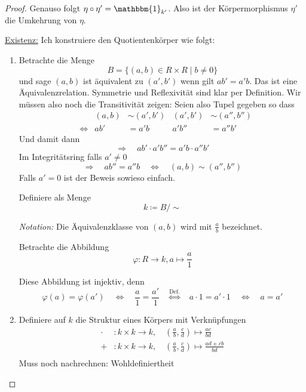 \documentclass[12pt,parskip=full]{scrartcl}
\newcommand{\heading}{\underline}
\theoremstyle{definition}
\theoremstyle{remark}
\begin{document}
\begin{proof}
		Genauso folgt $\eta \circ \eta'= \mathbbm{1}_{k'}$. Also ist der Körpermorphismus $\eta'$ die Umkehrung von $\eta$.
		
		\heading{Existenz:} Ich konstruiere den Quotientenkörper wie folgt:
		\begin{enumerate}
			\item Betrachte die Menge
			\begin{equation*}
				B = \{ (a,b) \in R \times R \mid b \neq 0 \}
			\end{equation*}
			und sage $(a,b)$ ist äquivalent zu $(a', b')$ wenn gilt $a b' = a' b$. Das ist eine Äquivalenzrelation. Symmetrie und Reflexivität sind klar per Definition. Wir müssen also noch die Transitivität zeigen: Seien also Tupel gegeben so dass
			\begin{align*}
				&&(a,b) &\sim (a', b') & (a', b') &\sim (a'',b'') \\
				&\Leftrightarrow& ab' &= a'b & a'b'' &= a''b'
			\end{align*}
			Und damit dann
			\begin{equation*}
				\Rightarrow\quad ab' \cdot a'b'' = a' b \cdot a'' b'
			\end{equation*}
			Im Integritätsring falls $a' \neq 0$
			\begin{equation*}
				\Rightarrow\quad a b'' = a'' b \quad\Leftrightarrow\quad (a,b) \sim (a'',b'')
			\end{equation*}
			Falls $a' = 0$ ist der Beweis sowieso einfach.
			
			Definiere als Menge
			\begin{equation*}
				k \coloneqq B / \sim
			\end{equation*}
			
			\textit{Notation:} Die Äquivalenzklasse von $(a,b)$ wird mit $\frac{a}{b}$ bezeichnet.
			
			Betrachte die Abbildung
			\begin{equation*}
				\varphi: R \to k, a \mapsto \frac{a}{1}
			\end{equation*}
			
			Diese Abbildung ist injektiv, denn 
			\begin{equation*}
				\varphi(a) = \varphi(a') \quad\Leftrightarrow\quad \frac{a}{1} = \frac{a'}{1} \overset{\text{Def.}}{\quad\Leftrightarrow\quad} a \cdot 1 = a' \cdot 1 \quad\Leftrightarrow\quad a = a'
			\end{equation*}
			\item Definiere auf $k$ die Struktur eines Körpers mit Verknüpfungen
			\begin{align*}
				\cdot&: k \times k \to k, \quad \left(\frac{a}{b}, \frac{c}{d}\right) \mapsto \frac{ac}{bd} \\
				+&: k \times k \to k, \quad \left(\frac{a}{b}, \frac{c}{d}\right) \mapsto \frac{ad + cb}{bd} \\
			\end{align*}
			Muss noch nachrechnen: Wohldefiniertheit
			

\end{enumerate}
\end{proof}
\end{document}
